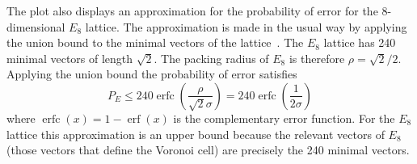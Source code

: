 \documentclass[journal]{IEEEtran}
\begin{document}
The plot also displays an approximation for the probability of error for the 8-dimensional $E_8$ lattice.  The approximation is made in the usual way by applying the union bound to the minimal vectors of the lattice~\cite[p.~71]{SPLAG}.  The $E_8$ lattice has 240 minimal vectors of length $\sqrt{2}$.  The packing radius of $E_8$ is therefore $\rho = \sqrt{2}/2$.  Applying the union bound the probability of error satisfies
\newcommand{\erfc}{\operatorname{erfc}}
\newcommand{\erf}{\operatorname{erf}}
\[
P_E \leq 240\erfc\left( \frac{\rho}{\sqrt{2}\sigma} \right) = 240\erfc\left(\frac{1}{2\sigma}\right)
\]
where $\erfc(x) = 1 - \erf(x)$ is the complementary error function.  For the $E_8$ lattice this approximation is an upper bound because the relevant vectors of $E_8$ (those vectors that define the Voronoi cell) are precisely the 240 minimal vectors.  %


\end{document}
